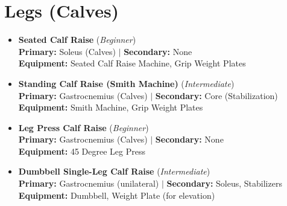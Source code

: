 \documentclass[11pt,a4paper]{article}
\begin{document}
\section*{Legs (Calves)}
\begin{itemize}[leftmargin=*]
  \item \textbf{Seated Calf Raise} (\textit{Beginner})\\
        \textbf{Primary:} Soleus (Calves) $|$ \textbf{Secondary:} None\\
        \textbf{Equipment:} Seated Calf Raise Machine, Grip Weight Plates
  \item \textbf{Standing Calf Raise (Smith Machine)} (\textit{Intermediate})\\
        \textbf{Primary:} Gastrocnemius (Calves) $|$ \textbf{Secondary:} Core (Stabilization)\\
        \textbf{Equipment:} Smith Machine, Grip Weight Plates
  \item \textbf{Leg Press Calf Raise} (\textit{Beginner})\\
        \textbf{Primary:} Gastrocnemius (Calves) $|$ \textbf{Secondary:} None\\
        \textbf{Equipment:} 45 Degree Leg Press
  \item \textbf{Dumbbell Single-Leg Calf Raise} (\textit{Intermediate})\\
        \textbf{Primary:} Gastrocnemius (unilateral) $|$ \textbf{Secondary:} Soleus, Stabilizers\\
        \textbf{Equipment:} Dumbbell, Weight Plate (for elevation)
\end{itemize}
\vspace{0.5em}
\end{document}
